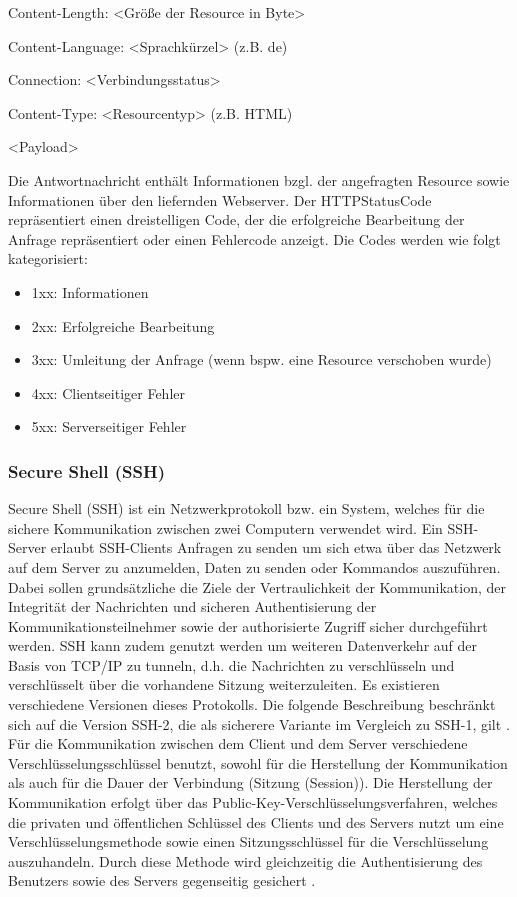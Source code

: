 Content-Length: <Größe der Resource in Byte>

Content-Language: <Sprachkürzel> (z.B. \glqq de\grqq )

Connection: <Verbindungsstatus>

Content-Type: <Resourcentyp> (z.B. HTML)

<Payload>


Die Antwortnachricht enthält Informationen bzgl. der angefragten Resource sowie Informationen über den liefernden Webserver. Der HTTPStatusCode repräsentiert einen dreistelligen Code, der die erfolgreiche Bearbeitung der Anfrage repräsentiert oder einen Fehlercode anzeigt. Die Codes werden wie folgt kategorisiert:
\begin{itemize}
\item 1xx: Informationen
\item 2xx: Erfolgreiche Bearbeitung
\item 3xx: Umleitung der Anfrage (wenn bspw. eine Resource verschoben wurde)
\item 4xx: Clientseitiger Fehler
\item 5xx:  Serverseitiger Fehler
\end{itemize}

\subsubsection{Secure Shell (SSH)}
Secure Shell (SSH) ist ein Netzwerkprotokoll bzw. ein System, welches für die sichere Kommunikation zwischen zwei Computern verwendet wird. Ein SSH-Server erlaubt SSH-Clients Anfragen zu senden um sich etwa über das Netzwerk auf dem Server zu anzumelden, Daten zu senden oder Kommandos auszuführen. Dabei sollen grundsätzliche die Ziele der Vertraulichkeit der Kommunikation, der Integrität der Nachrichten und sicheren Authentisierung der Kommunikationsteilnehmer sowie der authorisierte Zugriff sicher durchgeführt werden. SSH kann zudem genutzt werden um weiteren Datenverkehr auf der Basis von TCP/IP zu \glqq tunneln\grqq , d.h. die Nachrichten zu verschlüsseln und verschlüsselt über die vorhandene Sitzung weiterzuleiten. Es existieren verschiedene Versionen dieses Protokolls. Die folgende Beschreibung beschränkt sich auf die Version SSH-2, die als sicherere Variante im Vergleich zu SSH-1, gilt \citep{SSH1}. \\ %

Für die Kommunikation zwischen dem Client und dem Server verschiedene Verschlüsselungsschlüssel benutzt, sowohl für die Herstellung der Kommunikation als auch für die Dauer der Verbindung (Sitzung (Session)). Die Herstellung der Kommunikation erfolgt über das Public-Key-Verschlüsselungsverfahren, welches die privaten und öffentlichen Schlüssel des Clients und des Servers nutzt um eine Verschlüsselungsmethode sowie einen Sitzungsschlüssel für die Verschlüsselung auszuhandeln. Durch diese Methode wird gleichzeitig die Authentisierung des Benutzers sowie des Servers gegenseitig gesichert \citep{SSH1}. %


